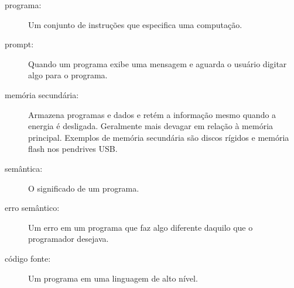 \begin{description}
\item[programa:] Um conjunto de instruções que especifica uma computação.
%

\item[prompt:] Quando um programa exibe uma mensagem e aguarda o usuário 
digitar algo para o programa.
%

\item[memória secundária:] Armazena programas e dados e retém a informação
mesmo quando a energia é desligada.  Geralmente mais devagar 
em relação à memória principal. Exemplos de memória secundária são
discos rígidos e memória flash nos pendrives USB.
%

\item[semântica:]  O significado de um programa.
%

\item[erro semântico:] Um erro em um programa que faz algo diferente
daquilo que o programador desejava.
%

\item[código fonte:] Um programa em uma linguagem de alto nível.
%

\end{description}
%

